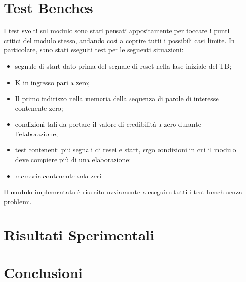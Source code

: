 \documentclass{article}
\begin{document}
\section{Test Benches}
I test svolti sul modulo sono stati pensati appositamente per toccare i punti critici del modulo stesso, andando così a coprire tutti i possibili casi limite.
In particolare, sono stati eseguiti test per le seguenti situazioni:
\begin{itemize}
    \item segnale di start dato prima del segnale di reset nella fase iniziale del TB;
    \item K in ingresso pari a zero;
    \item Il primo indirizzo nella memoria della sequenza di parole di interesse contenente zero;
    \item condizioni tali da portare il valore di credibilità a zero durante\\l'elaborazione;
    \item test contenenti più segnali di reset e start, ergo condizioni in cui il modulo deve compiere più di una elaborazione;
    \item memoria contenente solo zeri.
\end{itemize}
Il modulo implementato è riuscito ovviamente a eseguire tutti i test bench senza problemi.
\newpage
\section{Risultati Sperimentali}

\newpage
\section{Conclusioni}
\end{document}
